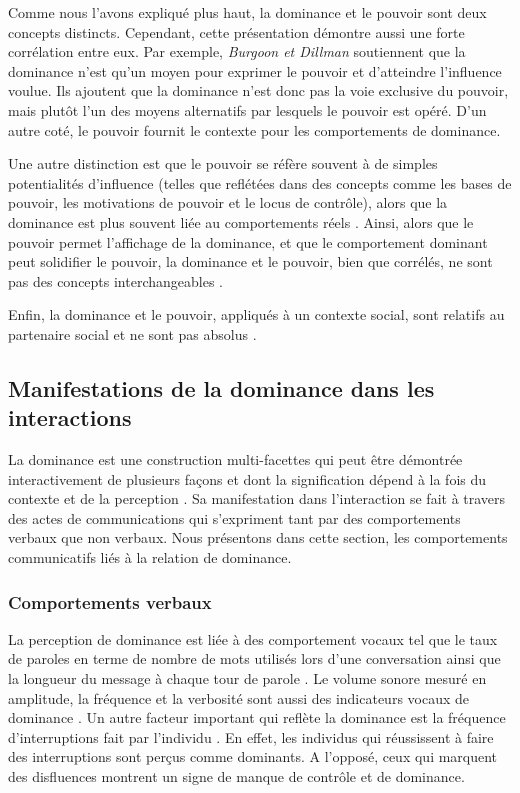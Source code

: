 		Comme nous l'avons expliqué plus haut, la dominance et le pouvoir sont deux concepts distincts. Cependant, cette présentation démontre aussi une forte corrélation entre eux. 
		Par exemple, \emph{Burgoon et Dillman} \cite{burgoon1995interpersonal} soutiennent que la dominance n'est qu'un moyen pour exprimer le pouvoir et d'atteindre l'influence voulue.
		Ils ajoutent que la dominance n'est donc pas la voie exclusive du pouvoir, mais plutôt l'un des moyens alternatifs par lesquels le pouvoir est opéré. D'un autre coté, le pouvoir fournit le contexte pour les comportements de dominance. %
		
		Une autre distinction est que le pouvoir se réfère souvent à de simples potentialités d'influence (telles que reflétées dans des concepts comme les bases de pouvoir, les motivations de pouvoir et le locus de contrôle),
		alors que la dominance est plus souvent liée au comportements réels \cite{dunbar2005perceptions,burgoon1998nature}. 
		Ainsi, alors que le pouvoir permet l'affichage de la dominance, et que le comportement dominant peut solidifier le pouvoir, la dominance et le pouvoir, bien que corrélés, ne sont pas des concepts interchangeables \cite{burgoon1995interpersonal}.
		
		Enfin, la dominance et le pouvoir, appliqués à un contexte social, sont relatifs au partenaire social et ne sont pas absolus \cite{dunbar2005perceptions}.
		

		
	\subsection{Manifestations de la dominance dans les interactions}
	\label{sec:manifesationDom}
		La dominance est une construction multi-facettes qui peut être démontrée interactivement de plusieurs façons et dont la signification dépend à la fois du contexte et de la perception \cite{dunbar2005perceptions}. Sa manifestation dans l'interaction se fait à travers des actes de communications qui s'expriment tant par des comportements verbaux que non verbaux.
		Nous présentons dans cette section, les comportements communicatifs liés à la relation de dominance. 
		
		\subsubsection{Comportements verbaux}
			La perception de dominance est liée à des comportement vocaux tel que le taux de paroles en terme de nombre de mots utilisés lors d'une conversation ainsi que la longueur du message à chaque tour de parole \cite{dunbar2005perceptions}. Le volume sonore mesuré en amplitude, la fréquence et la verbosité sont aussi des indicateurs vocaux de dominance \cite{dunbar2005perceptions}. 
			Un autre facteur important qui reflète la dominance est la fréquence d'interruptions fait par l'individu \cite{dunbar2005perceptions,hall2005nonverbal}. En effet, les individus qui réussissent à faire des interruptions sont perçus comme dominants. A l'opposé, ceux qui marquent des disfluences montrent un signe de manque de contrôle et de dominance. 

